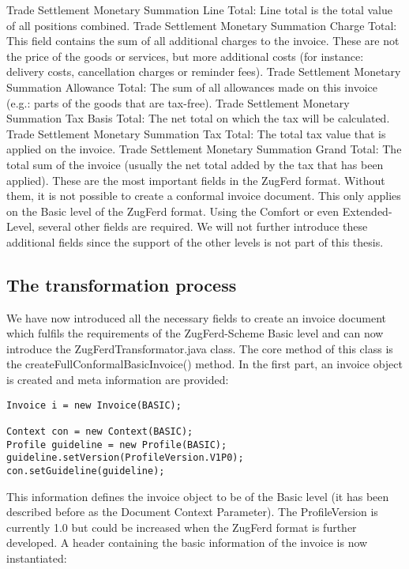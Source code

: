 Trade Settlement Monetary Summation Line Total: Line total is the total value of all positions combined.
Trade Settlement Monetary Summation Charge Total: This field contains the sum of all additional charges to the invoice. These are not the price of the goods or services, but more additional costs (for instance: delivery costs, cancellation charges or reminder fees).
Trade Settlement Monetary Summation Allowance Total: The sum of all allowances made on this invoice (e.g.: parts of the goods that are tax-free).
Trade Settlement Monetary Summation Tax Basis Total: The net total on which the tax will be calculated.
Trade Settlement Monetary Summation Tax Total: The total tax value that is applied on the invoice.
Trade Settlement Monetary Summation Grand Total: The total sum of the invoice (usually the net total added by the tax that has been applied).
These are the most important fields in the ZugFerd format. Without them, it is not possible to create a conformal invoice document. This only applies on the Basic level of the ZugFerd format. Using the Comfort or even Extended-Level, several other fields are required. We will not further introduce these additional fields since the support of the other levels is not part of this thesis. 

\subsection{The transformation process}

We have now introduced all the necessary fields to create an invoice document which fulfils the requirements of the ZugFerd-Scheme Basic level and can now introduce the ZugFerdTransformator.java class. The core method of this class is the createFullConformalBasicInvoice() method. 
In the first part, an invoice object is created and meta information are provided:

\begin{lstlisting}
Invoice i = new Invoice(BASIC);

Context con = new Context(BASIC);
Profile guideline = new Profile(BASIC);
guideline.setVersion(ProfileVersion.V1P0);
con.setGuideline(guideline);
\end{lstlisting}

This information defines the invoice object to be of the Basic level (it has been described before as the Document Context Parameter). The ProfileVersion is currently 1.0 but could be increased when the ZugFerd format is further developed.
A header containing the basic information of the invoice is now instantiated:

